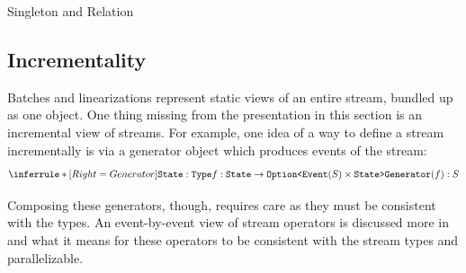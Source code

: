 Singleton and Relation



\subsection{Incrementality}

Batches and linearizations represent static views of an entire stream, bundled up as one object.
One thing missing from the presentation in this section is an incremental view of streams.
For example, one idea of a way to define a stream incrementally is via a generator object which produces events of the stream:
\[
\inference[Generator]
{
  \texttt{State}: \texttt{Type} \\
  f: \texttt{State} \to \texttt{Option<}\texttt{Event}(S) \times \texttt{State>}
}
{
  \texttt{Generator}(f): S
}
\]

Composing these generators, though, requires care as they must be consistent with the types. An event-by-event view of stream operators is discussed more in  and what it means for these operators to be consistent with the stream types and parallelizable.

